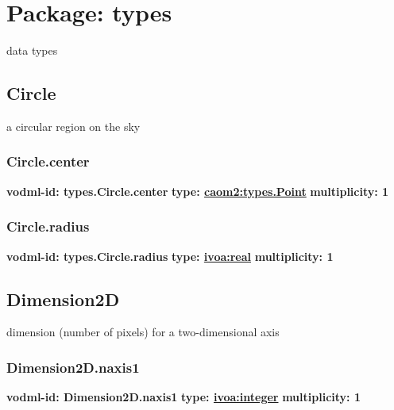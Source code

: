 \pagebreak
\section{Package: types }


  data types

  \subsection{Circle}
  \label{sect:types.Circle}
    a circular region on the sky

    \subsubsection{Circle.center}
      \textbf{vodml-id: types.Circle.center} \newline
      \textbf{type: \hyperref[sect:types.Point]{caom2:types.Point}} \newline
      \textbf{multiplicity: 1} 

    \subsubsection{Circle.radius}
      \textbf{vodml-id: types.Circle.radius} \newline
      \textbf{type: \hyperref[sect:ivoa]{ivoa:real}} \newline
      \textbf{multiplicity: 1} 

  \subsection{Dimension2D}
  \label{sect:types.Dimension2D}
    dimension (number of pixels) for a two-dimensional axis

    \subsubsection{Dimension2D.naxis1}
      \textbf{vodml-id: Dimension2D.naxis1} \newline
      \textbf{type: \hyperref[sect:ivoa]{ivoa:integer}} \newline
      \textbf{multiplicity: 1} 

